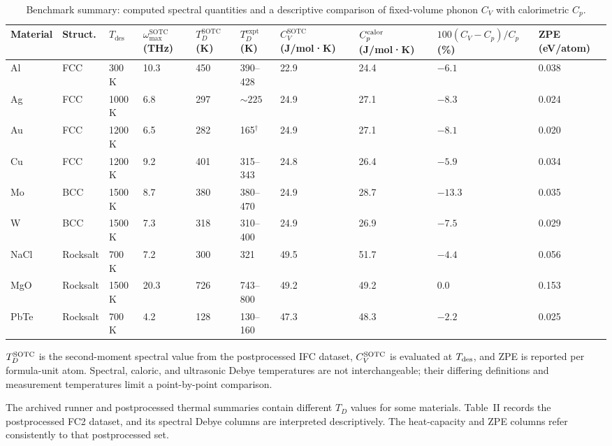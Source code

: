 \documentclass[aps,prb,reprint,amsmath,amssymb,floatfix]{revtex4-2}
\begin{document}
\begin{table}[htbp]
\tiny
\caption{Benchmark summary: computed spectral quantities and a descriptive comparison of fixed-volume phonon $C_V$ with calorimetric $C_p$.}
\begin{ruledtabular}
\begin{tabular}{llllllllll}Material & Struct. & \(T_\text{des}\) & \(\omega_\text{max}^\text{SOTC}\) (THz) & \(T_D^\text{SOTC}\) (K) & \(T_D^\text{expt}\) (K) & \(C_V^\text{SOTC}\) (J/mol·K) & \(C_p^{\rm calor}\) (J/mol·K) & \(100(C_V-C_p)/C_p\) (\%) & ZPE (eV/atom) \\
\hline
Al & FCC & 300 K & 10.3 & 450 & 390--428 \cite{ref22} & 22.9 &
24.4 & $-6.1$ & 0.038 \\
Ag & FCC & 1000 K & 6.8 & 297 & \(\sim\!225\) \cite{ref25} & 24.9 & 27.1
& $-8.3$ & 0.024 \\
Au & FCC & 1200 K & 6.5 & 282 & 165\(^\dagger\) \cite{ref23} & 24.9 &
27.1 & $-8.1$ & 0.020 \\
Cu & FCC & 1200 K & 9.2 & 401 & 315--343 \cite{ref24,ref33} & 24.8 & 26.4 &
$-5.9$ & 0.034 \\
Mo & BCC & 1500 K & 8.7 & 380 & 380--470 \cite{ref26} & 24.9 &
28.7 & $-13.3$ & 0.035 \\
W & BCC & 1500 K & 7.3 & 318 & 310--400 \cite{ref27} & 24.9 & 26.9 & $-7.5$
& 0.029 \\
NaCl & Rocksalt & 700 K & 7.2 & 300 & 321 \cite{ref28} & 49.5 & 51.7 &
$-4.4$ & 0.056 \\
MgO & Rocksalt & 1500 K & 20.3 & 726 & 743--800 \cite{ref29,ref30} &
49.2 & 49.2 & 0.0 & 0.153 \\
PbTe & Rocksalt & 700 K & 4.2 & 128 & 130--160 \cite{ref31,ref32} & 47.3
& 48.3 & $-2.2$ & 0.025 \\
\end{tabular}
\end{ruledtabular}
\label{tab:2}
\end{table}

\(T_D^{\rm SOTC}\) is the second-moment spectral value from the
postprocessed IFC dataset, \(C_V^{\rm SOTC}\) is evaluated at
\(T_{\rm des}\), and ZPE is reported per formula-unit atom. Spectral, caloric,
and ultrasonic Debye temperatures are not interchangeable; their differing
definitions and measurement temperatures limit a point-by-point comparison.

The archived runner and postprocessed thermal summaries contain different
\(T_D\) values for some materials. Table~II records the postprocessed FC2
dataset, and its spectral Debye columns are interpreted descriptively. The
heat-capacity and ZPE columns refer consistently to that postprocessed set.
\end{document}
